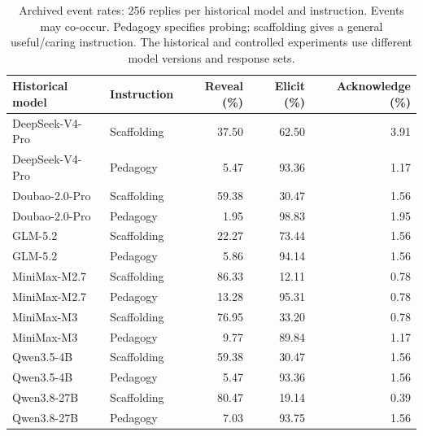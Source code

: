 \begin{table}[t]
\centering\small
\begin{tabular}{llrrr}
\toprule
Historical model & Instruction & Reveal (\%) & Elicit (\%) & Acknowledge (\%) \\
\midrule
DeepSeek-V4-Pro & Scaffolding & 37.50 & 62.50 & 3.91 \\
DeepSeek-V4-Pro & Pedagogy & 5.47 & 93.36 & 1.17 \\
Doubao-2.0-Pro & Scaffolding & 59.38 & 30.47 & 1.56 \\
Doubao-2.0-Pro & Pedagogy & 1.95 & 98.83 & 1.95 \\
GLM-5.2 & Scaffolding & 22.27 & 73.44 & 1.56 \\
GLM-5.2 & Pedagogy & 5.86 & 94.14 & 1.56 \\
MiniMax-M2.7 & Scaffolding & 86.33 & 12.11 & 0.78 \\
MiniMax-M2.7 & Pedagogy & 13.28 & 95.31 & 0.78 \\
MiniMax-M3 & Scaffolding & 76.95 & 33.20 & 0.78 \\
MiniMax-M3 & Pedagogy & 9.77 & 89.84 & 1.17 \\
Qwen3.5-4B & Scaffolding & 59.38 & 30.47 & 1.56 \\
Qwen3.5-4B & Pedagogy & 5.47 & 93.36 & 1.56 \\
Qwen3.8-27B & Scaffolding & 80.47 & 19.14 & 0.39 \\
Qwen3.8-27B & Pedagogy & 7.03 & 93.75 & 1.56 \\
\bottomrule
\end{tabular}
\caption{Archived event rates: 256 replies per historical model and instruction.
Events may co-occur. Pedagogy specifies probing; scaffolding gives a general
useful/caring instruction. The historical and controlled experiments use different model versions and response sets.}
\label{tab:archive-rates}
\end{table}

